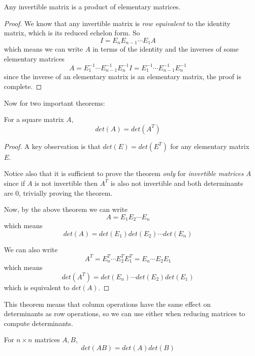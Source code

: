 \begin{theorem}
Any invertible matrix is a product of elementary matrices.
\end{theorem}

\begin{proof}
We know that any invertible matrix is \textit{row equivalent} to the identity matrix, which is its reduced echelon form. So 
$$I = E_{n} E_{n-1} \cdots E_{1} A$$
which means we can write $A$ in terms of the identity and the inverses of some elementary  matrices 
$$A = E_{1}^{-1} \cdots E_{n-1}^{-1} E_{n}^{-1} I = E_{1}^{-1} \cdots E_{n-1}^{-1} E_{n}^{-1}$$
since the inverse of an elementary matrix is an elementary matrix, the proof is complete. 
\end{proof} 

Now for two important theorems:

\begin{theorem}
For a square matrix $A$, 
$$det(A) = det(A^{T})$$
\end{theorem}

\begin{proof}
A key observation is that $det(E) = det(E^{T})$ for any elementary matrix $E$. 

Notice also that it is sufficient to prove the theorem \textit{only} for \textit{invertible matrices} $A$ since if $A$ is not invertible then $A^{T}$ is also not invertible and both determinants are 0, trivially proving the theorem. 

Now, by the above theorem we can write
$$A = E_{1} E_{2} \cdots E_{n}$$
which means 
$$det(A) = det(E_{1}) det(E_{2}) \cdots det(E_{n})$$

We can also write 
$$A^{T} = E_{n}^{T} \cdots E_{2}^{T} E_{1}^{T} = E_{n} \cdots E_{2} E_{1}$$
which means 
$$det(A^{T}) = det(E_{n}) \cdots det(E_{2}) det(E_{1})$$
which is equivalent to $det(A)$. 
\end{proof}

This theorem means that column operations have the same effect on determinants as row operations, so we can use either when reducing matrices to compute determinants. 

\begin{theorem}
For $n \times n$ matrices $A, B$, 
$$det(AB) = det(A) det(B)$$
\end{theorem}

